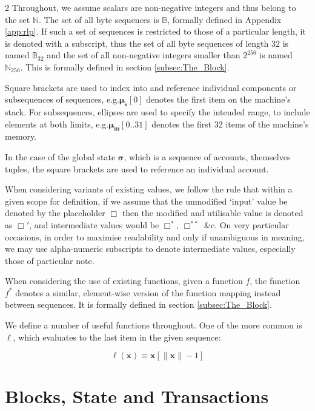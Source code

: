 \documentclass[9pt,oneside]{amsart}
\makeatletter
\newcommand{\linkdest}[1]{\Hy@raisedlink{\hypertarget{#1}{}}}
\newcommand*\eg{e.g.\@\xspace}
\makeatother
\begin{document}
\begin{multicols}{2}
Throughout, we assume scalars are non-negative integers and thus belong to the set $\mathbb{N}$. The set of all byte sequences is $\mathbb{B}$, formally defined in Appendix \ref{app:rlp}. If such a set of sequences is restricted to those of a particular length, it is denoted with a subscript, thus the set of all byte sequences of length $32$ is named $\mathbb{B}_{32}$ and the set of all non-negative integers smaller than $2^{256}$ is named $\mathbb{N}_{256}$. This is formally defined in section \hyperlink{block}{\ref{subsec:The_Block}}.

Square brackets are used to index into and reference individual components or subsequences of sequences, \eg $\boldsymbol{\mu}_{\mathbf{s}}[0]$ denotes the first item on the machine's stack. For subsequences, ellipses are used to specify the intended range, to include elements at both limits, \eg $\boldsymbol{\mu}_{\mathbf{m}}[0..31]$ denotes the first 32 items of the machine's memory.

In the case of the global state $\boldsymbol{\sigma}$, which is a sequence of accounts, themselves tuples, the square brackets are used to reference an individual account.

When considering variants of existing values, we follow the rule that within a given scope for definition, if we assume that the unmodified `input' value be denoted by the placeholder $\Box$ then the modified and utilisable value is denoted as $\Box'$, and intermediate values would be $\Box^*$,  $\Box^{**}$ \&c. On very particular occasions, in order to maximise readability and only if unambiguous in meaning, we may use alpha-numeric subscripts to denote intermediate values, especially those of particular note.

When considering the use of existing functions, given a function $f$, the function \hyperlink{general_element_wise_sequence_transformation_f_pow_asterisk}{$f^*$} denotes a similar, element-wise version of the function mapping instead between sequences. It is formally defined in section \hyperlink{block}{\ref{subsec:The_Block}}.

We define a number of useful functions throughout. \linkdest{ell}One of the more common is $\ell$, which evaluates to the last item in the given sequence:

\begin{equation}
\ell(\mathbf{x}) \equiv \mathbf{x}[\lVert \mathbf{x} \rVert - 1]
\end{equation}

\section{Blocks, State and Transactions} \label{ch:bst}


\end{multicols}
\end{document}
